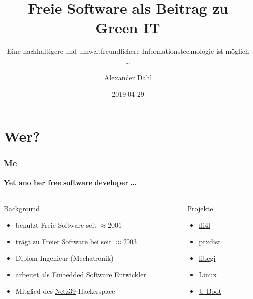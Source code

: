 \documentclass[t]{beamer}
\title[Green FLOSS]{Freie Software als Beitrag zu Green IT}
\subtitle{Eine nachhaltigere und umweltfreundlichere Informationstechnologie ist möglich …}
\author{Alexander Dahl}
\institute[blog.antiblau.de]{\url{http://blog.antiblau.de/}}
\date{2019-04-29}
\begin{document}
\begin{frame}
    \titlepage
\end{frame}



\section*{Wer?}

\begin{frame}
    \frametitle{Me}
    \framesubtitle{Yet another free software developer \dots}

    \begin{columns}[T]
        \begin{column}{0.7\textwidth}
            \begin{block}{Background}
                \begin{itemize}
                    \item benutzt Freie Software seit $\approx 2001$
                    \item trägt zu Freier Software bei seit $\approx 2003$
                    \item Diplom-Ingenieur (Mechatronik)
                    \item arbeitet als Embedded Software Entwickler
                    \item Mitglied des \href{http://www.netz39.de/}{Netz39} Hackerspace
                \end{itemize}
            \end{block}
        \end{column}
        \pause
        \begin{column}{0.3\textwidth}
            \begin{block}{Projekte}
                \begin{itemize}
                    \item \href{https://www.fli4l.de/}{fli4l}
                    \item \href{https://ptxdist.org/}{ptxdist}
                    \item \href{https://github.com/rafaelsteil/libcgi}{libcgi}
                    \item \href{https://www.kernel.org/}{Linux}
                    \item \href{https://www.denx.de/wiki/U-Boot/}{U-Boot}
                \end{itemize}
            \end{block}
        \end{column}
    \end{columns}
\end{frame}
\end{document}
